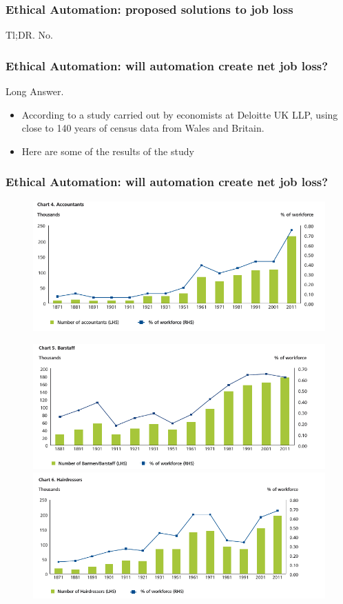 \begin{frame}
\frametitle{Ethical Automation: proposed solutions to job loss}
{\Large Tl;DR. No.}
\end{frame}
\begin{frame}
	\frametitle{Ethical Automation: will automation create net job loss? }
	{\Large Long Answer.}
	\begin{itemize}
	\item According to a study carried out by economists at Deloitte UK LLP, using close to 140 years of census data from Wales and Britain.
	\item Here are some of the results of the study
	\end{itemize}
\end{frame}
\begin{frame}
	\frametitle{Ethical Automation: will automation create net job loss? }
	\begin{figure}[th]
	\centering
	\includegraphics[scale=0.3]{diagrams/accountants-growth}
	\end{figure}
	\begin{figure}[h]
		\includegraphics[scale=0.3]{diagrams/barstaff-growth}
		\includegraphics[scale=0.3]{diagrams/hairdressers-growth}
	\end{figure}
\end{frame}

